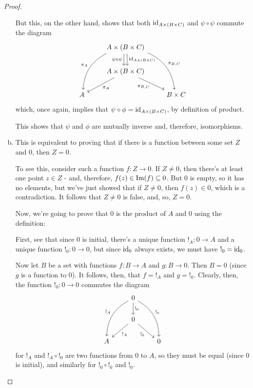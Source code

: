 \begin{proof}
\begin{enumerate}[(a)]
		But this, on the other hand, shows that both ${\rm id}_{A\times(B\times C)}$ and $\psi\circ\psi$ commute the diagram
		\[\begin{tikzcd}
		& A\times(B\times C) \arrow[ldd, "\pi_A"', bend right] \arrow[d, "{\id_{A\times(B\times C)}}",shift left] \arrow[rdd, "{\pi_{B,C}}", bend left] \arrow[d, "\psi\circ\psi"',shift right] &           \\
		& A\times(B\times C) \arrow[ld, "\pi_A"] \arrow[rd, "{\pi_{B,C}}"']                                                                               &           \\
		A &                                                                                                                                                 & B\times C
		\end{tikzcd}\]which, once again, implies that $\psi\circ\phi={\rm id}_{A\times(B\times C)}$, by definition of product.
		
		This shows that $\psi$ and $\phi$ are mutually inverse and, therefore, isomorphisms.
		
		\item This is equivalent to proving that if there is a function between some set $Z$ and $0$, then $Z=0$.
		
		To see this, consider such a function $f:Z\to 0$. If $Z\neq 0$, then there's at least one point $z\in Z$ - and, therefore, $f(z)\in \operatorname{Im}(f)\subseteq 0$. But $0$ is empty, so it has no elements, but we've just showed that if $Z\neq 0$, then $f(z)\in 0$, which is a contradiction. It follows that $Z\neq0$ is false, and, so, $Z=0$.
		
		Now, we're going to prove that $0$ is the product of $A$ and $0$ using the definition:
		
		First, see that since $0$ is initial, there's a unique function $!_A:0\to A$ and a unique function $!_0:0\to 0$, but since ${\rm id}_0$ always exists, we must have $!_0={\rm id}_0$.
		
		Now let $B$ be a set with functions $f:B\to A$ and $g:B\to 0$. Then $B=0$ (since $g$ is a function to $0$). It follows, then, that $f=!_A$ and $g=!_0$. Clearly, then, the function $!_0:0\to 0$ commutes the diagram
		\[\begin{tikzcd}
		& 0 \arrow[d, "!_0"] \arrow[ldd, "!_A"', bend right] \arrow[rdd, "!_0", bend left] &   \\
		& 0 \arrow[ld, "!_A"] \arrow[rd, "!_0"']                                        &   \\
		A &                                                                               & 0
		\end{tikzcd}\]for $!_A$ and $!_A\circ!_0$ are two functions from 0 to $A$, so they must be equal (since $0$ is initial), and similarly for $!_0\circ!_0$ and $!_0$. 
		

\end{enumerate}
\end{proof}
